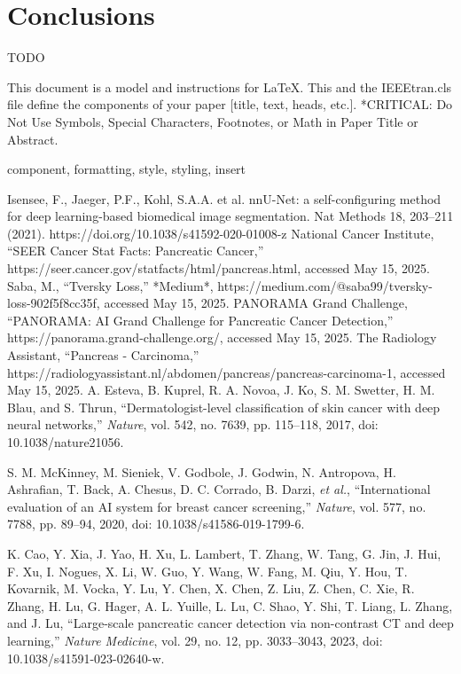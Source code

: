 \documentclass[conference]{IEEEtran}
\begin{document}
\section{Conclusions}
TODO

This document is a model and instructions for \LaTeX.
This and the IEEEtran.cls file define the components of your paper [title, text, heads, etc.]. *CRITICAL: Do Not Use Symbols, Special Characters, Footnotes, 
or Math in Paper Title or Abstract.

\begin{IEEEkeywords}
component, formatting, style, styling, insert
\end{IEEEkeywords}

\begin{thebibliography}{00}
 Isensee, F., Jaeger, P.F., Kohl, S.A.A. et al. nnU-Net: a self-configuring method for deep learning-based biomedical image segmentation. Nat Methods 18, 203–211 (2021). https://doi.org/10.1038/s41592-020-01008-z
 National Cancer Institute, ``SEER Cancer Stat Facts: Pancreatic Cancer,'' https://seer.cancer.gov/statfacts/html/pancreas.html, accessed May 15, 2025.
 Saba, M., ``Tversky Loss,'' *Medium*, https://medium.com/@saba99/tversky-loss-902f5f8cc35f, accessed May 15, 2025.
 PANORAMA Grand Challenge, ``PANORAMA: AI Grand Challenge for Pancreatic Cancer Detection,'' https://panorama.grand-challenge.org/, accessed May 15, 2025.
 The Radiology Assistant, ``Pancreas - Carcinoma,'' https://radiologyassistant.nl/abdomen/pancreas/pancreas-carcinoma-1, accessed May 15, 2025.
 A. Esteva, B. Kuprel, R. A. Novoa, J. Ko, S. M. Swetter, H. M. Blau, and S. Thrun, ``Dermatologist-level classification of skin cancer with deep neural networks,'' \textit{Nature}, vol. 542, no. 7639, pp. 115--118, 2017, doi: 10.1038/nature21056.

 S. M. McKinney, M. Sieniek, V. Godbole, J. Godwin, N. Antropova, H. Ashrafian, T. Back, A. Chesus, D. C. Corrado, B. Darzi, \textit{et al.}, ``International evaluation of an AI system for breast cancer screening,'' \textit{Nature}, vol. 577, no. 7788, pp. 89--94, 2020, doi: 10.1038/s41586-019-1799-6.

 K. Cao, Y. Xia, J. Yao, H. Xu, L. Lambert, T. Zhang, W. Tang, G. Jin, J. Hui, F. Xu, I. Nogues, X. Li, W. Guo, Y. Wang, W. Fang, M. Qiu, Y. Hou, T. Kovarnik, M. Vocka, Y. Lu, Y. Chen, X. Chen, Z. Liu, Z. Chen, C. Xie, R. Zhang, H. Lu, G. Hager, A. L. Yuille, L. Lu, C. Shao, Y. Shi, T. Liang, L. Zhang, and J. Lu, ``Large-scale pancreatic cancer detection via non-contrast CT and deep learning,'' \textit{Nature Medicine}, vol. 29, no. 12, pp. 3033--3043, 2023, doi: 10.1038/s41591-023-02640-w.







\end{thebibliography}
\end{document}
